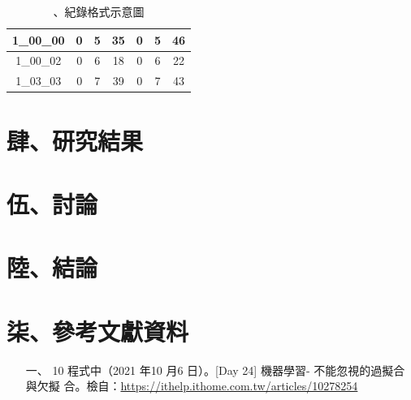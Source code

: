 \begin{itemize}
    \begin{table}[H]
        \centering
        \caption{、紀錄格式示意圖}
        \label{紀錄格式示意圖}
        \begin{tabular}{ccccccc}
            \hline
            1\_00\_00 & 0 & 5 & 35 & 0 & 5 & 46\\
            \hline
            1\_00\_02 & 0 & 6 & 18 & 0 & 6 & 22\\
            \hline
            1\_03\_03 & 0 & 7 & 39 & 0 & 7 & 43\\
            \hline
        \end{tabular}
    \end{table}
\end{itemize}

\section{肆、研究結果}

\section{伍、討論}

\section{陸、結論}

\section{柒、參考文獻資料}
\begin{itemize}
    \item [一、] 10 程式中（2021 年10 月6 日）。[Day 24] 機器學習- 不能忽視的過擬合與欠擬
    合。檢自：\url{https://ithelp.ithome.com.tw/articles/10278254}
\end{itemize}